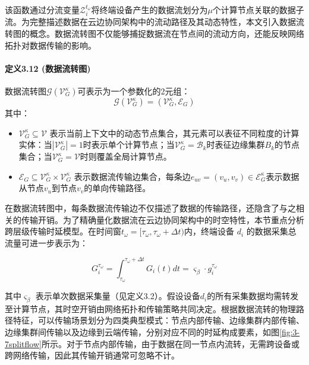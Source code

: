 该函数通过分流变量$\mathcal{Z}_i^{t_\omega}$将终端设备产生的数据流划分为$\mu$个计算节点关联的数据子流。为完整描述数据在云边协同架构中的流动路径及其动态特性，本文引入数据流转图的概念。数据流转图不仅能够捕捉数据流在节点间的流动方向，还能反映网络拓扑对数据传输的影响。

\paragraph{定义3.12 (数据流转图)} 数据流转图$\mathcal{G}(\mathcal{V}_{G}^{κ})$可表示为一个参数化的2元组：
\[
\mathcal{G}(\mathcal{V}_{G}^{κ}) = (\mathcal{V}_{G}^{κ}, \mathcal{E}_G)
\]
其中：
\begin{itemize}
    \item $\mathcal{V}_{G}^{κ} \subseteq \mathcal{V}$ 表示当前上下文中的动态节点集合，其元素可以表征不同粒度的计算实体：当$|\mathcal{V}_{G}^{κ}|=1$时表示单个计算节点；当$\mathcal{V}_{G}^{κ} = \mathcal{B}_k$时表征边缘集群$B_k$的节点集合；当$\mathcal{V}_{G}^{κ} = \mathcal{V}$时则覆盖全局计算节点。
    \item $\mathcal{E}_G \subseteq \mathcal{V}_{G}^{κ} \times \mathcal{V}_{G}^{κ}$ 表示数据流传输边集合，每条边$e_{uv} = (v_u, v_v) \in \mathcal{E}_{G}^{κ}$表示数据从节点$v_u$到节点$v_v$的单向传输路径。
\end{itemize}

在数据流转图中，每条数据流传输边不仅描述了数据的传输路径，还隐含了与之相关的传输开销。为了精确量化数据流在云边协同架构中的时空特性，本节重点分析跨层级传输时延模型。在时间窗$t_\omega = [\tau_\omega, \tau_\omega + \Delta t)$内，终端设备 $d_i$ 的数据采集总流量可进一步表示为：

\begin{equation}
G_i^{\tau_\omega} = \int_{\tau_\omega}^{\tau_\omega+\Delta t} G_i(t)dt = \varsigma_\beta \cdot g_i^{\tau_\omega}
\end{equation}

其中$\varsigma_\beta$ 表示单次数据采集量（见定义3.2）。假设设备$d_i$的所有采集数据均需转发至计算节点，其时空开销由网络拓扑和传输策略共同决定。根据数据流转的物理路径特征，可以传输场景划分为四类典型模式：节点内部传输、边缘集群内部传输、边缘集群间传输以及边缘到云端传输，分别对应不同的时延构成要素，如图\ref{fig:3-7splitflow}所示。对于节点内部传输，由于数据在同一节点内流转，无需跨设备或跨网络传输，因此其传输开销通常可忽略不计。

